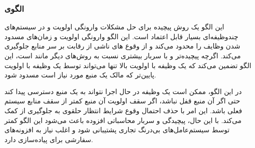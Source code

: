 \subsubsection{الگوی }
\label{resourcePriorCeilSec}
\begin{RTL}
این الگو یک روش پیچیده برای حل مشکلات وارونگی اولویت
و  در سیستم‌های چندوظیفه‌ای بسیار قابل اعتماد است.
این الگو وارونگی اولویت و زمان‌های مسدود شدن وظایف را محدود می‌کند
و از وقوع های ناشی از رقابت بر سر منابع جلوگیری می‌کند.
اگرچه پیچیده‌تر و با سربار بیشتری نسبت به روش‌های دیگر مانند
 است، این الگو تضمین می‌کند
که یک وظیفه با اولویت بالا تنها می‌تواند توسط یک وظیفه با اولویت پایین‌تر
که مالک یک منبع مورد نیاز است مسدود شود.
\end{RTL}
\begin{RTL}
در این الگو، ممکن است یک وظیفه در حال اجرا نتواند
به یک منبع دسترسی پیدا کند حتی اگر آن منبع قفل نباشد،
اگر سقف اولویت آن منبع کمتر از سقف منابع سیستم فعلی باشد.
این امر با حذف احتمال وقوع شرایط انتظار حلقوی
به جلوگیری از  کمک می‌کند.
با این حال، پیچیدگی و سربار محاسباتی افزوده باعث می‌شود این الگو کمتر توسط
سیستم‌عامل‌های بی‌درنگ تجاری پشتیبانی شود
و اغلب نیاز به افزونه‌های سفارشی برای پیاده‌سازی دارد.
\end{RTL}